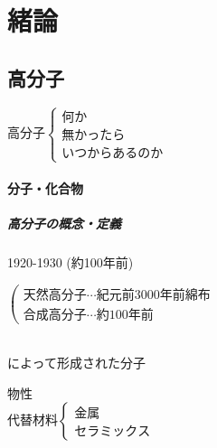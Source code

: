 \documentclass{../../../notebook}
\begin{document}

\section{緒論}

\subsection{高分子}

$\mathrm{高分子}\begin{cases}\mathrm{何か}\\\mathrm{無かったら}\\\mathrm{いつからあるのか}\end{cases}$

\paragraph{分子・化合物}

\subparagraph{高分子の概念・定義}

 1920-1930 (約100年前)\\

\par

$\left(\begin{array}{l}
  \mathrm{天然高分子} \cdots \mathrm{紀元前3000年前 綿布} \\
  \mathrm{合成高分子} \cdots \mathrm{約100年前}
\end{array}\right.$\\\\

\par

\begin{tcolorbox}[colframe=black!50,colback=white,colbacktitle=black!50,coltitle=white,title=高分子]
\setlength{\baselineskip}{5pt}
によって形成された分子\\
\end{tcolorbox}


物性\\
$\mathrm{代替材料}\begin{cases}\mathrm{金属}\\\mathrm{セラミックス}\end{cases}$\\\\
\end{document}

